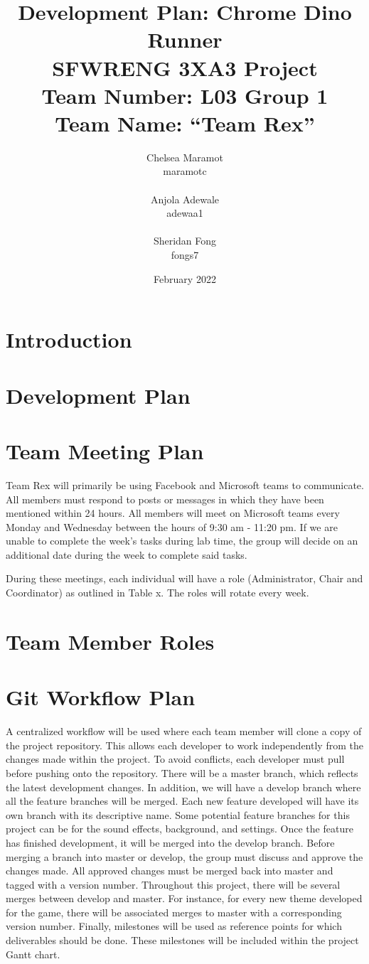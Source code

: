 \documentclass{article}
\title{Development Plan: Chrome Dino Runner \\ \bigskip \large SFWRENG 3XA3 Project \\ \bigskip \large Team Number: L03 Group 1 \\ \large Team Name: ``Team Rex'' }
\author{Chelsea Maramot \\ maramotc \\ \\ Anjola Adewale \\ adewaa1 \\ \\ Sheridan Fong \\ fongs7 }
\date{February 2022}
\begin{document}
	
	\maketitle
	
	\section{Introduction}
	
	\section{Development Plan}
	
	\section{Team Meeting Plan}
	Team Rex will primarily be using Facebook and Microsoft teams to communicate.
	All members must respond to posts or messages in which they have been mentioned within 24 hours. All members will meet on Microsoft teams every Monday and Wednesday between the hours of 9:30 am - 11:20 pm. If we are unable to complete the week’s tasks during lab time, the group will decide on an additional date during the week to complete said tasks.
	
	During these meetings, each individual will have a role (Administrator, Chair and Coordinator) as outlined in Table x. The roles will rotate every week.
	
	
	\section{Team Member Roles}
	
	\section{Git Workflow Plan}

	A centralized workflow will be used where each team member will clone a copy of the project repository.
	This allows each developer to work independently from the changes made within the project. 
	To avoid conflicts, each developer must pull before pushing onto the repository. 
	There will be a master branch, which reflects the latest development changes. 
	In addition, we will have a develop branch where all the feature branches will be merged.
	Each new feature developed will have its own branch with its descriptive name.
	Some potential feature branches for this project can be for the sound effects, background, and settings. 
	Once the feature has finished development, it will be merged into the develop branch. 
	Before merging a branch into master or develop, the group must discuss and approve the changes made. 
	All approved changes must be merged back into master and tagged with a version number. 
	Throughout this project, there will be several merges between develop and master. 
	For instance, for every new theme developed for the game, there will be associated merges to master with a corresponding version number. Finally, milestones will be used as reference points for which deliverables should be done. These milestones will be included within the project Gantt chart.
\end{document}
